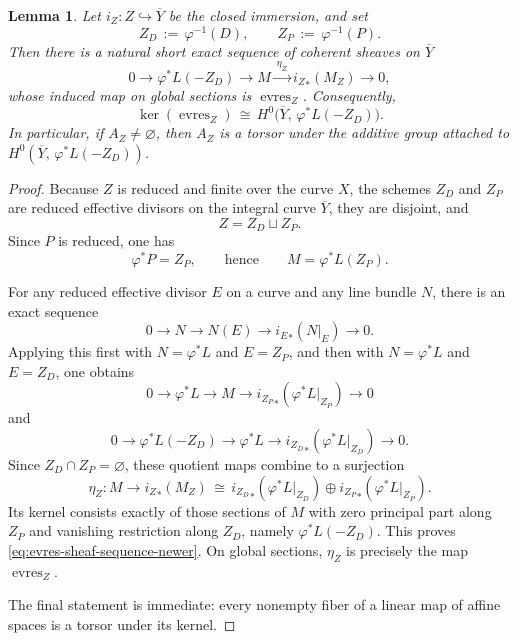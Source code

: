 \documentclass[a4paper,12pt]{amsart}
\numberwithin{equation}{section}
\newtheorem{lemma}[theorem]{Lemma}
\theoremstyle{definition}
\newcommand{\evres}{\operatorname{evres}}
\begin{document}
\begin{lemma}\label{lem:evres-kernel-new}
Let \(i_Z:Z\hookrightarrow \overline{Y}\) be the closed immersion, and set
\[
Z_D\,:=\,\varphi^{-1}(D),
\qquad
Z_P\,:=\,\varphi^{-1}(P).
\]
Then there is a natural short exact sequence of coherent sheaves on \(\overline{Y}\)
\begin{equation}\label{eq:evres-sheaf-sequence-newer}
0\longrightarrow \varphi^*L(-Z_D)
\longrightarrow M
\xrightarrow{\ \eta_Z\ }
{i_Z}_*(M_Z)
\longrightarrow 0,
\end{equation}
whose induced map on global sections is \(\evres_Z\).  Consequently,
\[
\ker(\evres_Z)\,\cong\, H^0\bigl(\overline{Y},\,\varphi^*L(-Z_D)\bigr).
\]
In particular, if \(A_Z\neq\varnothing\), then \(A_Z\) is a torsor under the additive group attached to \(H^0(\overline{Y},\,\varphi^*L(-Z_D))\).
\end{lemma}
\begin{proof}
Because \(Z\) is reduced and finite over the curve \(X\), the schemes \(Z_D\) and \(Z_P\) are reduced effective divisors on the integral curve \(\overline{Y}\), they are disjoint, and
\[
Z=Z_D\sqcup Z_P.
\]
Since \(P\) is reduced, one has
\[
\varphi^*P=Z_P,
\qquad\text{hence}\qquad
M=\varphi^*L(Z_P).
\]

For any reduced effective divisor \(E\) on a curve and any line bundle \(N\), there is an exact sequence
\[
0\longrightarrow N\longrightarrow N(E)\longrightarrow {i_E}_*(N|_E)\longrightarrow 0.
\]
Applying this first with \(N=\varphi^*L\) and \(E=Z_P\), and then with \(N=\varphi^*L\) and \(E=Z_D\), one obtains
\[
0\longrightarrow \varphi^*L
\longrightarrow M
\longrightarrow {i_{Z_P}}_*(\varphi^*L|_{Z_P})
\longrightarrow 0
\]
and
\[
0\longrightarrow \varphi^*L(-Z_D)
\longrightarrow \varphi^*L
\longrightarrow {i_{Z_D}}_*(\varphi^*L|_{Z_D})
\longrightarrow 0.
\]
Since \(Z_D\cap Z_P=\varnothing\), these quotient maps combine to a surjection
\[
\eta_Z:M\longrightarrow {i_Z}_*(M_Z)
\,\cong\,
{i_{Z_D}}_*(\varphi^*L|_{Z_D})\oplus {i_{Z_P}}_*(\varphi^*L|_{Z_P}).
\]
Its kernel consists exactly of those sections of \(M\) with zero principal part along \(Z_P\) and vanishing restriction along \(Z_D\), namely \(\varphi^*L(-Z_D)\).  This proves \eqref{eq:evres-sheaf-sequence-newer}.  On global sections, \(\eta_Z\) is precisely the map \(\evres_Z\).

The final statement is immediate: every nonempty fiber of a linear map of affine spaces is a torsor under its kernel.
\end{proof}
\end{document}
